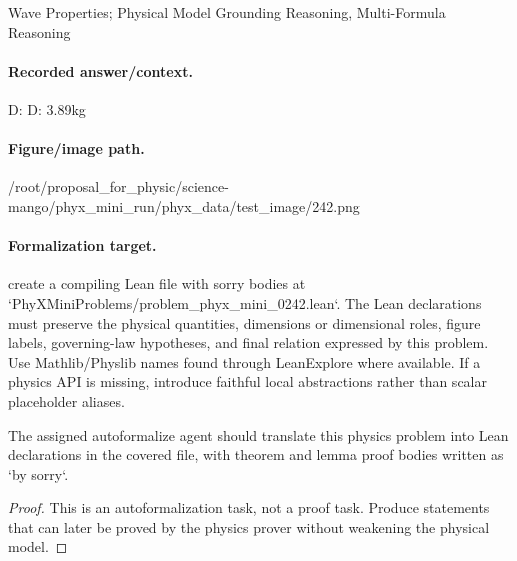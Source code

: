 Wave Properties; Physical Model Grounding Reasoning, Multi-Formula Reasoning

\paragraph{Recorded answer/context.}
D: D: 3.89kg

\paragraph{Figure/image path.}
/root/proposal\_for\_physic/science-mango/phyx\_mini\_run/phyx\_data/test\_image/242.png

\paragraph{Formalization target.}
create a compiling Lean file with sorry bodies at `PhyXMiniProblems/problem\_phyx\_mini\_0242.lean`. The Lean declarations must preserve the physical quantities, dimensions or dimensional roles, figure labels, governing-law hypotheses, and final relation expressed by this problem.
Use Mathlib/Physlib names found through LeanExplore where available. If a physics API is missing, introduce faithful local abstractions rather than scalar placeholder aliases.

\begin{theorem}
\label{thm:physics:phyx_mini_0242:target}
The assigned autoformalize agent should translate this physics problem into Lean declarations in the covered file, with theorem and lemma proof bodies written as `by sorry`.
\end{theorem}
\begin{proof}
This is an autoformalization task, not a proof task. Produce statements that can later be proved by the physics prover without weakening the physical model.
\end{proof}

